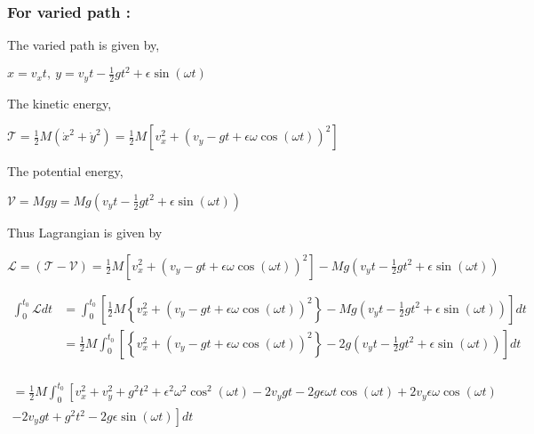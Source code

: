\documentclass[12pt, a4paper]{article} %
\begin{document}
\subsubsection*{For varied path :}
The varied path is given by, 
\begin{center}
    $\displaystyle x = v_x t,\ y = v_y t - \frac{1}{2}gt^2 + \epsilon\sin(\omega t)$
\end{center}
The kinetic energy,
\begin{center}
    $\displaystyle \mathcal{T} = \frac{1}{2}M\left(\dot{x}^2 + \dot{y}^2\right) = \frac{1}{2}M\left[v^2_x + \left(v_y -gt + \epsilon \omega\cos(\omega t)\right)^2\right]$
\end{center}
The potential energy,
\begin{center}
    $\displaystyle \mathcal{V} = Mgy = Mg\left(v_y t -\frac{1}{2}gt^2 + \epsilon\sin(\omega t)\right)$
\end{center}

Thus Lagrangian is given by 
\begin{center}
    $\displaystyle \mathscr{L} = \left(\mathcal{T - V}\right) = \frac{1}{2}M\left[v^2_x + \left(v_y -gt + \epsilon \omega\cos(\omega t)\right)^2\right] -  Mg\left(v_y t -\frac{1}{2}gt^2 + \epsilon\sin(\omega t)\right)$
\end{center}

\begin{equation*}
    \begin{split}
        \int_{0}^{t_0}\mathscr{L}dt & = \int_{0}^{t_0}\left[\frac{1}{2}M\left\{v^2_x + \left(v_y -gt + \epsilon \omega\cos(\omega t)\right)^2\right\} -  Mg\left(v_y t -\frac{1}{2}gt^2 + \epsilon\sin(\omega t)\right)\right]dt\\[3mm]
        & = \frac{1}{2}M\int_{0}^{t_0}\left[\left\{v^2_x + \left(v_y -gt + \epsilon \omega\cos(\omega t)\right)^2\right\} -  2g\left(v_y t -\frac{1}{2}gt^2 + \epsilon\sin(\omega t)\right)\right]dt\\[3mm]
    \end{split}
\end{equation*}

\begin{multline*}
     = \frac{1}{2}M\int_{0}^{t_0}\left[v^2_x + v^2_y + g^2t^2 + \epsilon^2\omega^2\cos^2(\omega t) - 2v_y gt - 2g\epsilon\omega t\cos(\omega t) + 2v_y \epsilon\omega\cos(\omega t)\right.\\
    \left. -2v_y gt + g^2t^2 - 2g\epsilon\sin(\omega t)\right]dt
\end{multline*}
\end{document}
